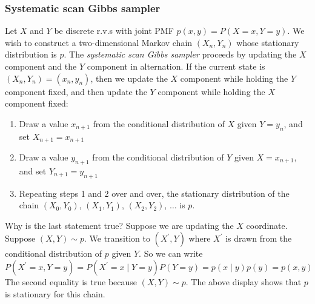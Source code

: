 \documentclass[11pt,a4paper]{article}
\begin{document}
\subsubsection{ Systematic scan Gibbs sampler}
Let $X$ and $Y$ be discrete r.v.s with joint PMF $p(x,y) = P(X = x, Y = y)$. We wish to construct a two-dimensional Markov chain $(X_n,Y_n)$ whose stationary distribution is $p$.
The \textit{systematic scan Gibbs sampler} proceeds by updating the $X$ component and the $Y$ component in alternation. If the current state is $\left(X_n, Y_n\right)=\left(x_n, y_n\right)$, then we update the $X$ component while holding the $Y$ component fixed, and then update the $Y$ component while holding the $X$ component fixed:
\begin{enumerate}
    \item Draw a value $x_{n+1}$ from the conditional distribution of $X$ given $Y=y_n$, and set $X_{n+1}=x_{n+1}$
    \item Draw a value $y_{n+1}$ from the conditional distribution of $Y$ given $X=x_{n+1}$, and set $Y_{n+1}=y_{n+1}$
    \item Repeating steps 1 and 2 over and over, the stationary distribution of the chain $\left(X_0, Y_0\right)$, $\left(X_1, Y_1\right)$, $\left(X_2, Y_2\right)$, $\ldots$ is $p$.
\end{enumerate}

Why is the last statement true? Suppose we are updating the $X$ coordinate. Suppose $(X, Y) \sim p$. We transition to $\left(X^{\prime}, Y\right)$ where $X^{\prime}$ is drawn from the conditional distribution of $p$ given $Y$. So we can write
$$
P\left(X^{\prime}=x, Y=y\right)=P\left(X^{\prime}=x \mid Y=y\right) P(Y=y)=p(x \mid y) p(y)=p(x, y)
$$
The second equality is true because $(X, Y) \sim p$. The above display shows that $p$ is stationary for this chain.
\end{document}
